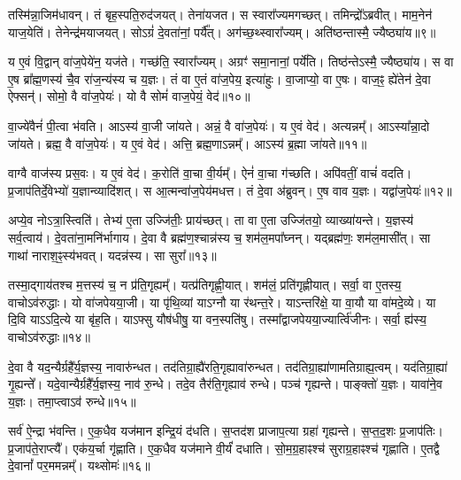 तस्मि॑न्ना॒जिम॑धावन्।
तं बृह॒स्पति॒रुद॑जयत्।
तेना॑यजत।
स स्वारा᳚ज्यमगच्छत्।
तमिन्द्रो᳚\-ऽब्रवीत्।
माम॒नेन॑ याज॒येति॑।
तेनेन्द्र॑मयाजयत्।
सोऽग्रं॑ दे॒वता॑नां॒ पर्यै᳚त्।
अग॑च्छ॒थ्स्वारा᳚ज्यम्।
अति॑ष्ठन्तास्मै॒ ज्यैष्ठ्या॑य॥९॥\ip

य ए॒वं वि॒द्वान् वा॑ज॒पेये॑न॒ यज॑ते।
गच्छ॑ति॒ स्वारा᳚ज्यम्।
अग्रꣳ॑ समा॒नानां॒ पर्ये॑ति।
तिष्ठ॑न्ते\-ऽस्मै॒ ज्यैष्ठ्या॑य।
स वा ए॒ष ब्रा᳚ह्म॒णस्य॑ चै॒व रा॑ज॒न्य॑स्य च य॒ज्ञः।
तं वा ए॒तं वा॑ज॒पेय॒ इत्या॑हुः।
वा॒जाप्यो॒ वा ए॒षः।
वाज॒ꣴ॒ ह्ये॑तेन॑ दे॒वा ऐफ्सन्॑।
सोमो॒ वै वा॑ज॒पेयः॑।
यो वै सोमं॑ वाज॒पेयं॒ वेद॑॥१०॥\ip

वा॒ज्ये॑वैनं॑ पी॒त्वा भ॑वति।
आऽस्य॑ वा॒जी जा॑यते।
अन्नं॒ वै वा॑ज॒पेयः॑।
य ए॒वं वेद॑।
अत्यन्नम्᳚।
आऽस्या᳚न्ना॒दो जा॑यते।
ब्रह्म॒ वै वा॑ज॒पेयः॑।
य ए॒वं वेद॑।
अत्ति॒ ब्रह्म॒णा\-ऽन्नम्᳚।
आऽस्य॑ ब्र॒ह्मा जा॑यते॥११॥\ip

वाग्वै वाज॑स्य प्रस॒वः।
य ए॒वं वेद॑।
क॒रोति॑ वा॒चा वी॒र्यम्᳚।
ऐनं॑ वा॒चा ग॑च्छति।
अपि॑वतीं॒ वाचं॑ वदति।
प्र॒जा\-प॑तिर्दे॒वेभ्यो॑ य॒ज्ञान्व्यादि॑शत्।
स आ॒त्मन्वा॑ज॒पेय॑मधत्त।
तं दे॒वा अ॑ब्रुवन्।
ए॒ष वाव य॒ज्ञः।
यद्वा॑ज॒पेयः॑॥१२॥\ip

अप्ये॒व नोऽत्रा॒स्त्विति॑।
तेभ्य॑ ए॒ता उज्जि॑तीः॒ प्राय॑च्छत्।
ता वा ए॒ता उज्जि॑तयो॒ व्याख्या॑यन्ते।
य॒ज्ञस्य॑ सर्व॒त्वाय॑।
दे॒वता॑ना॒मनि॑र्भागाय।
दे॒वा वै ब्रह्म॑ण॒श्चान्न॑स्य च॒ शम॑ल॒मपा᳚घ्नन्।
यद्ब्रह्म॑णः॒ शम॑ल॒मासी᳚त्।
सा गाथा॑ नाराश॒ꣴ॒स्य॑भवत्।
यदन्न॑स्य।
सा सुरा᳚॥१३॥\ip

तस्मा॒द्गाय॑तश्च म॒त्तस्य॑ च॒ न प्र॑ति॒गृह्यम्᳚।
यत्प्र॑तिगृह्णी॒यात्।
शम॑लं॒ प्रति॑\-गृह्णीयात्।
सर्वा॒ वा ए॒तस्य॒ वाचो\-ऽव॑रुद्धाः।
यो वा॑जपेयया॒जी।
या पृ॑थि॒व्यां याऽग्नौ या र॑थन्त॒रे।
याऽन्तरि॑क्षे॒ या वा॒यौ या वा॑मदे॒व्ये।
या दि॒वि याऽऽदि॒त्ये या बृ॑ह॒ति।
याऽफ्सु यौष॑धीषु॒ या वन॒स्पति॑षु।
तस्मा᳚द्वाजपेयया॒ज्यार्त्वि॑जीनः।
सर्वा॒ ह्य॑स्य॒ वाचो\-ऽव॑रुद्धाः॥१४॥\ip\anuvakamend[धा॒वा॒मेति॒ ज्यैष्ठ्या॑य॒ वेद॑ ब्र॒ह्मा जा॑यते वाज॒पेयः॒ सुरा\-ऽऽर्त्वि॑जीन॒ एकं॑ च]

दे॒वा वै यद॒न्यैर्ग्रहै᳚र्य॒ज्ञस्य॒ नावारु॑न्धत।
तद॑तिग्रा॒ह्यै॑रति॒\-गृह्या\-वा॑रुन्धत।
तद॑तिग्रा॒ह्या॑णामति\-ग्राह्य॒त्वम्।
यद॑तिग्रा॒ह्या॑ गृ॒ह्यन्ते᳚।
यदे॒वान्यैर्ग्रहै᳚र्य॒ज्ञस्य॒ नाव॑ रु॒न्धे।
तदे॒व तैर॑ति॒गृह्या\-व॑ रुन्धे।
पञ्च॑ गृह्यन्ते।
पाङ्क्तो॑ य॒ज्ञः।
यावा॑ने॒व य॒ज्ञः।
तमा॒प्त्वा\-ऽव॑ रुन्धे॥१५॥\ip

सर्व॑ ऐ॒न्द्रा भ॑वन्ति।
ए॒क॒धैव यज॑मान इन्द्रि॒यं द॑धति।
स॒प्तद॑श प्राजाप॒त्या ग्रहा॑ गृह्यन्ते।
स॒प्त॒द॒शः प्र॒जा\-प॑तिः।
प्र॒जा\-प॑ते॒राप्त्यै᳚।
एक॑य॒र्चा गृ॑ह्णाति।
ए॒क॒धैव यज॑माने वी॒र्यं॑ दधाति।
सो॒म॒ग्र॒हाꣴश्च॑ सुराग्र॒हाꣴश्च॑ गृह्णाति।
ए॒तद्वै दे॒वानां᳚ पर॒ममन्नम्᳚।
यथ्सोमः॑॥१६॥\ip

